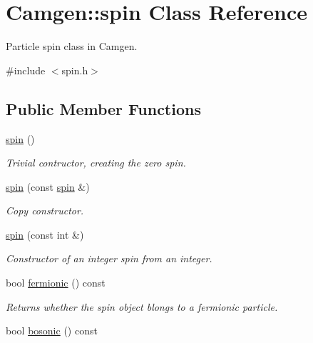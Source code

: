 \hypertarget{a00501}{\section{Camgen\-:\-:spin Class Reference}
\label{a00501}
}


Particle spin class in Camgen.  




{\ttfamily \#include $<$spin.\-h$>$}

\subsection*{Public Member Functions}
\begin{DoxyCompactItemize}
\item 
\hypertarget{a00501_a422237930fd513ffb06a1b00abd5b401}{\hyperlink{a00501_a422237930fd513ffb06a1b00abd5b401}{spin} ()}\label{a00501_a422237930fd513ffb06a1b00abd5b401}

\begin{DoxyCompactList}\small\item\em Trivial contructor, creating the zero spin. \end{DoxyCompactList}\item 
\hypertarget{a00501_a185c3feef1ced89bbde10c44e0f22f1c}{\hyperlink{a00501_a185c3feef1ced89bbde10c44e0f22f1c}{spin} (const \hyperlink{a00501}{spin} \&)}\label{a00501_a185c3feef1ced89bbde10c44e0f22f1c}

\begin{DoxyCompactList}\small\item\em Copy constructor. \end{DoxyCompactList}\item 
\hypertarget{a00501_a8fbfc2cbe5b80c415dfc6768032155c6}{\hyperlink{a00501_a8fbfc2cbe5b80c415dfc6768032155c6}{spin} (const int \&)}\label{a00501_a8fbfc2cbe5b80c415dfc6768032155c6}

\begin{DoxyCompactList}\small\item\em Constructor of an integer spin from an integer. \end{DoxyCompactList}\item 
\hypertarget{a00501_a82d6b1a4b924c35cb8d31170ee5268e5}{bool \hyperlink{a00501_a82d6b1a4b924c35cb8d31170ee5268e5}{fermionic} () const }\label{a00501_a82d6b1a4b924c35cb8d31170ee5268e5}

\begin{DoxyCompactList}\small\item\em Returns whether the spin object blongs to a fermionic particle. \end{DoxyCompactList}\item 
\hypertarget{a00501_a8bd2fdcc018f130c11c365ca086a050a}{bool \hyperlink{a00501_a8bd2fdcc018f130c11c365ca086a050a}{bosonic} () const }\label{a00501_a8bd2fdcc018f130c11c365ca086a050a}


\end{DoxyCompactItemize}
